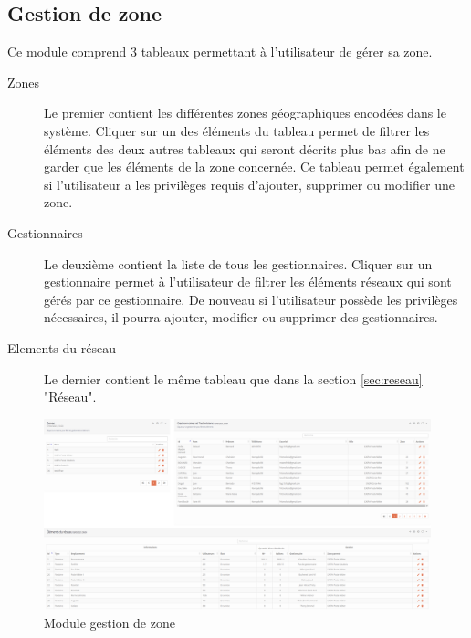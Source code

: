 \documentclass{EPL-master-thesis-covers-FR}
\begin{document}
			\subsection{Gestion de zone}
				Ce module comprend 3 tableaux permettant à l'utilisateur de gérer sa zone.
				\begin{description}
					\item[Zones] Le premier contient les différentes zones géographiques encodées dans le système. Cliquer sur un des éléments du tableau permet de filtrer les éléments des deux autres tableaux qui seront décrits plus bas afin de ne garder que les éléments de la zone concernée. Ce tableau permet également si l'utilisateur a les privilèges requis d'ajouter, supprimer ou modifier une zone.
					\item[Gestionnaires] Le deuxième contient la liste de tous les gestionnaires. Cliquer sur un gestionnaire permet à l'utilisateur de filtrer les éléments réseaux qui sont gérés par ce gestionnaire. De nouveau si l'utilisateur possède les privilèges nécessaires, il pourra ajouter, modifier ou supprimer des gestionnaires.
					\item [Elements du réseau] Le dernier contient le même tableau que dans la section \ref{sec:reseau} "Réseau".
				\end{description}
				\begin{figure}[H]
					\centering
					\includegraphics[width=1\textwidth]{images/gestion}
					\caption{Module gestion de zone}
				\end{figure}
			
\end{document}
